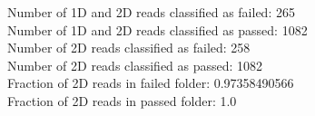 Number of 1D and 2D reads classified as failed: 265\\
Number of 1D and 2D reads classified as passed: 1082\\
Number of 2D reads classified as failed: 258\\
Number of 2D reads classified as passed: 1082\\
Fraction of 2D reads in failed folder: 0.97358490566\\
Fraction of 2D reads in passed folder: 1.0\\
